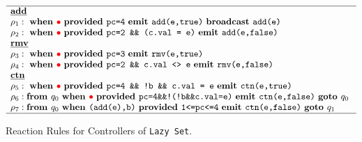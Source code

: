 \begin{figure}
  {\footnotesize
    \[
\begin{array}{l}
\hline
{\mbox{\underline{\textbf{add}}}}  \\
\rho_1 : \mbox{ \bf when }\textcolor{red}{\bullet}\mbox{ \bf provided }\mbox{\tt pc=4}\mbox{ \bf emit }\mbox{\tt add(e,true)}\mbox{ \bf broadcast } \mbox{\tt add(e)}\\
\rho_2 :   \mbox{ \bf when }\textcolor{red}{\bullet}\mbox{ \bf provided }\mbox{\tt pc=2 \&\& (c.val = e)}\mbox{ \bf emit }\mbox{\tt add(e,false)}\ \\
 {\mbox{\underline{\textbf{rmv}}}} \\
\rho_3 :   \mbox{ \bf when }\textcolor{red}{\bullet}\mbox{ \bf provided }\mbox{\tt pc=3}\mbox{ \bf emit }\mbox{\tt rmv(e,true)}\ \\
\rho_4 :   \mbox{ \bf when }\textcolor{red}{\bullet}\mbox{ \bf provided }\mbox{\tt pc=2 \&\& c.val <> e}\mbox{ \bf emit }\mbox{\tt rmv(e,false)}\ \\
 {\mbox{\underline{\textbf{ctn}}}} \\
\rho_5: \mbox{ \bf when }\textcolor{red}{\bullet}\mbox{ \bf provided }\mbox{\tt pc=4 \&\& !b \&\& c.val = e}\mbox{ \bf emit }\mbox{\tt ctn(e,true)}\ \\
\rho_6:    \mbox{\bf from } {q}_0 \mbox{ \bf when }\textcolor{red}{\bullet}\mbox{ \bf provided }\mbox{\tt pc=4\&\&!(!b\&\&c.val=e)}\mbox{ \bf emit }\mbox{\tt ctn(e,false)}\mbox{ \bf goto } {q}_0\ \\
\rho_7 :  \mbox{\bf from } {q}_0 \mbox{ \bf when }\mbox{\tt (add(e),b)}\mbox{ \bf provided }\mbox{\tt 1<=pc<=4}\mbox{ \bf emit }\mbox{\tt ctn(e,false)} \mbox{ \bf goto } {q}_1\ \\
\hline  
\end{array}
\]
  }
  \vspace*{-0.5cm}
  \caption{Reaction Rules for Controllers of {\tt Lazy Set}.}
  \label{rrules:lazy:list:fig}
\end{figure}
